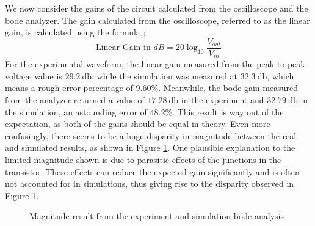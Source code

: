 \documentclass[11pt]{report}
\begin{document}
We now consider the gains of the circuit calculated from the oscilloscope and the bode analyzer. The gain calculated from the oscilloscope, referred to as the linear gain, is calculated using the formula \autocite{Lab2BJT};
\begin{equation}
	\text{Linear Gain in } dB = 20\log_{10}\frac{V_{out}}{V_{in}}
\end{equation}
For the experimental waveform, the linear gain measured from the peak-to-peak voltage value is $\SI{29.2}{\decibel}$, while the simulation was measured at $\SI{32.3}{\decibel}$, which means a rough error percentage of $9.60\%$. Meanwhile, the bode gain measured from the analyzer returned a value of $\SI{17.28}{\decibel}$ in the experiment and $\SI{32.79}{\decibel}$ in the simulation, an astounding error of $48.2\%$. This result is way out of the expectation, as both of the gains should be equal in theory. Even more confusingly, there seems to be a huge disparity in magnitude between the real and simulated results, as shown in Figure \ref{sect3-2}. One plausible explanation to the limited magnitude shown is due to parasitic effects of the junctions in the transistor. These effects can reduce the expected gain significantly and is often not accounted for in simulations, thus giving rise to the disparity observed in Figure \ref{sect3-2}.
\begin{figure}[h]
	\centering
	\caption{Magnitude result from the experiment and simulation bode analysis}
	\label{sect3-2}
\end{figure}
\end{document}
